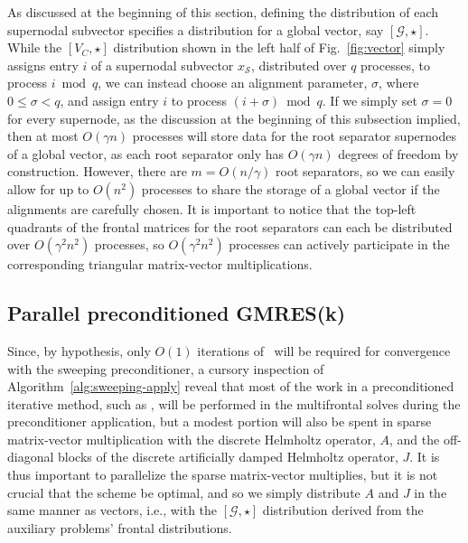 As discussed at the beginning of this section, defining the distribution of 
each supernodal subvector specifies a distribution for a global vector,
say $[\mathcal{G},\star]$. While the $[V_C,\star]$ distribution shown in  
the left half of Fig.~\ref{fig:vector} simply assigns entry $i$ of a 
supernodal subvector $x_{\mathcal{S}}$, distributed over $q$ processes, to 
process $i \bmod q$, we can instead choose an alignment 
parameter, $\sigma$, where $0 \le \sigma < q$, and assign entry $i$ to 
process $(i + \sigma) \bmod q$. If we simply set $\sigma=0$ for every 
supernode, as the discussion at the beginning of this subsection implied, then 
at most $O(\gamma n)$ processes will store data for the root separator 
supernodes of a global vector, as each root separator only has $O(\gamma n)$ 
degrees of freedom by construction.
However, there are $m=O(n/\gamma)$ root separators, so we can easily allow 
for up to $O(n^2)$ processes to share the storage of a global vector if the 
alignments are carefully chosen. 
It is important to notice that the top-left quadrants of the 
frontal matrices for the root separators can each be distributed over 
$O(\gamma^2 n^2)$ processes, so $O(\gamma^2 n^2)$ processes can actively 
participate in the corresponding triangular matrix-vector multiplications.

\subsection{Parallel preconditioned GMRES(k)}
Since, by hypothesis, only $O(1)$ iterations of \gmresk~will be required for 
convergence with the sweeping preconditioner, a cursory inspection of 
Algorithm~\ref{alg:sweeping-apply} reveal that most of the work in a 
preconditioned iterative method, such as \gmresk, will be performed in the 
multifrontal solves during the preconditioner application, but a modest 
portion will also be spent in sparse matrix-vector multiplication with the 
discrete Helmholtz operator, $A$, and the off-diagonal blocks of the discrete 
artificially damped Helmholtz operator, 
$J$. It is thus important to parallelize the sparse matrix-vector multiplies, 
but it is not crucial that the scheme be optimal, and so we simply distribute
$A$ and $J$ in the same manner as vectors, i.e., with the $[\mathcal{G},\star]$ 
distribution derived from the auxiliary problems' frontal distributions. 

